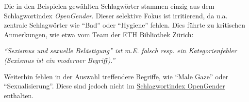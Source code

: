 \documentclass[
  nswissgerman,
  letterpaper,
  DIV=11,
  numbers=noendperiod]{scrartcl}
\begin{document}
\begin{tcolorbox}[enhanced jigsaw, arc=.35mm, bottomrule=.15mm, bottomtitle=1mm, breakable, colback=white, colbacktitle=quarto-callout-important-color!10!white, colframe=quarto-callout-important-color-frame, coltitle=black, left=2mm, leftrule=.75mm, opacityback=0, opacitybacktitle=0.6, rightrule=.15mm, title=\textcolor{quarto-callout-important-color}{\faExclamation}\hspace{0.5em}{Hinweis zur anstehenden Überarbeitung des Handbuchs}, titlerule=0mm, toprule=.15mm, toptitle=1mm]

Die in den Beispielen gewählten Schlagwörter stammen einzig aus dem
Schlagwortindex \emph{OpenGender}. Dieser selektive Fokus ist
irritierend, da u.a. zentrale Schlagwörter wie ``Bad'' oder ``Hygiene''
fehlen. Dies führte zu kritischen Anmerkungen, wie etwa vom Team der ETH
Bibliothek Zürich:

\emph{``Sexismus und sexuelle Belästigung'' ist m.E. falsch resp. ein
Kategorienfehler (Sexismus ist ein moderner Begriff).''}

Weiterhin fehlen in der Auswahl treffendere Begriffe, wie ``Male Gaze''
oder ``Sexualisierung''. Diese sind jedoch nicht im
\href{https://opengenderplatform.de/schlagwortindex\#:~:text=Der\%20Schlagwortindex\%20GenderOpen\%20ist\%20ein,besteht\%20aus\%20einem\%20kontrollierten\%20Vokabular}{Schlagwortindex
OpenGender} enthalten.

\end{tcolorbox}
\end{document}
